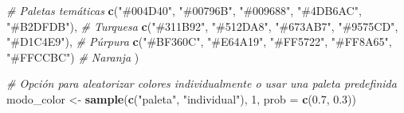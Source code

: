\documentclass[
]{article}
\newenvironment{Shaded}{\begin{snugshade}}{\end{snugshade}}
\newcommand{\AttributeTok}[1]{\textcolor[rgb]{0.13,0.29,0.53}{#1}}
\newcommand{\CommentTok}[1]{\textcolor[rgb]{0.56,0.35,0.01}{\textit{#1}}}
\newcommand{\DecValTok}[1]{\textcolor[rgb]{0.00,0.00,0.81}{#1}}
\newcommand{\FloatTok}[1]{\textcolor[rgb]{0.00,0.00,0.81}{#1}}
\newcommand{\FunctionTok}[1]{\textcolor[rgb]{0.13,0.29,0.53}{\textbf{#1}}}
\newcommand{\NormalTok}[1]{#1}
\newcommand{\OtherTok}[1]{\textcolor[rgb]{0.56,0.35,0.01}{#1}}
\newcommand{\StringTok}[1]{\textcolor[rgb]{0.31,0.60,0.02}{#1}}
\begin{document}
\begin{Shaded}
\begin{Highlighting}[]
  \CommentTok{\# Paletas temáticas}
  \FunctionTok{c}\NormalTok{(}\StringTok{"\#004D40"}\NormalTok{, }\StringTok{"\#00796B"}\NormalTok{, }\StringTok{"\#009688"}\NormalTok{, }\StringTok{"\#4DB6AC"}\NormalTok{, }\StringTok{"\#B2DFDB"}\NormalTok{),  }\CommentTok{\# Turquesa}
  \FunctionTok{c}\NormalTok{(}\StringTok{"\#311B92"}\NormalTok{, }\StringTok{"\#512DA8"}\NormalTok{, }\StringTok{"\#673AB7"}\NormalTok{, }\StringTok{"\#9575CD"}\NormalTok{, }\StringTok{"\#D1C4E9"}\NormalTok{),  }\CommentTok{\# Púrpura}
  \FunctionTok{c}\NormalTok{(}\StringTok{"\#BF360C"}\NormalTok{, }\StringTok{"\#E64A19"}\NormalTok{, }\StringTok{"\#FF5722"}\NormalTok{, }\StringTok{"\#FF8A65"}\NormalTok{, }\StringTok{"\#FFCCBC"}\NormalTok{)   }\CommentTok{\# Naranja}
\NormalTok{)}

\CommentTok{\# Opción para aleatorizar colores individualmente o usar una paleta predefinida}
\NormalTok{modo\_color }\OtherTok{\textless{}{-}} \FunctionTok{sample}\NormalTok{(}\FunctionTok{c}\NormalTok{(}\StringTok{"paleta"}\NormalTok{, }\StringTok{"individual"}\NormalTok{), }\DecValTok{1}\NormalTok{, }\AttributeTok{prob =} \FunctionTok{c}\NormalTok{(}\FloatTok{0.7}\NormalTok{, }\FloatTok{0.3}\NormalTok{))}


\end{Highlighting}
\end{Shaded}
\end{document}
